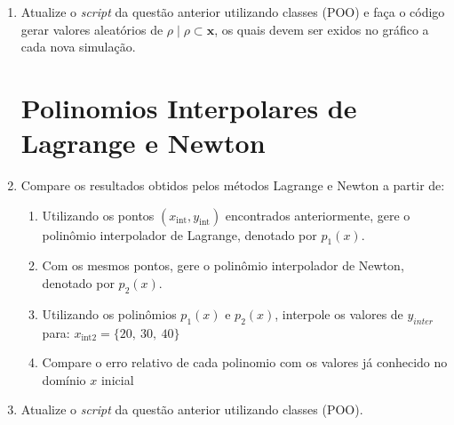 \documentclass[12pt]{elsarticle}
\begin{document}
\begin{enumerate}
	\begin{enumerate}
		\item Utilizando regressão linear pelo métodos dos mínimos quadrados, escreva um {\it script} que 
		 determine os coeficientes  do polinômio $p(x) = ax  + b$.
		\item Com o polinômio $p(x)$ obtido, calcule os valores correspondentes de $y_{int}$ para os seguintes pontos:
		\(x_{\text{int}} = \{25,\ 35,\ 42\}\)		
		\item Com o polinômio $p(x)$, encontre o novo contra-domínio ($NovoY$) e mostre o erro relativo ao modelo($p(x)$);
		\item Trace um gráfico contendo: $(x \times y)$, $(x \times NovoY)$,($x_{int} \times y_{int}$) do item anterior.
	\end{enumerate}
	\item Atualize o {\it script} da questão anterior utilizando classes (POO) e faça o código gerar valores 
	aleatórios de $\rho \mid \rho  \subset \mathbf{x}$, os quais devem ser exidos no gráfico a cada nova simulação.


\section*{Polinomios Interpolares de Lagrange e Newton}	
	\item Compare os resultados obtidos pelos métodos Lagrange e Newton a partir de:
	\begin{enumerate}
		\item Utilizando os pontos $(x_{\text{int}}, y_{\text{int}})$ encontrados anteriormente, gere o polinômio interpolador de Lagrange, denotado por $p_1(x)$.
		\item Com os mesmos pontos, gere o polinômio interpolador de Newton, denotado por $p_2(x)$.
		\item Utilizando os polinômios $p_1(x)$ e $p_2(x)$, interpole os valores de $y_{inter}$ para:
		\(x_{\text{int2}} = \{20,\ 30,\ 40\}\)
		\item Compare o erro relativo de cada polinomio com os valores já conhecido no domínio $x$ inicial	
	\end{enumerate}

	\item Atualize o {\it script} da questão anterior utilizando classes (POO).

	

\end{enumerate}
	
	
\end{document}
